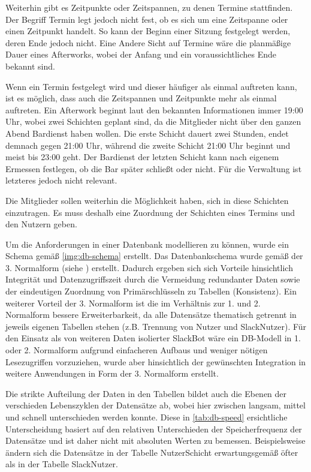 Weiterhin gibt es Zeitpunkte oder Zeitspannen, zu denen Termine stattfinden. Der Begriff Termin legt jedoch nicht fest, ob es sich um eine Zeitspanne oder einen Zeitpunkt handelt. So kann der Beginn einer Sitzung festgelegt werden, deren Ende jedoch nicht. Eine Andere Sicht auf Termine wäre die planmäßige Dauer eines Afterworks, wobei der Anfang und ein voraussichtliches Ende bekannt sind.

Wenn ein Termin festgelegt wird und dieser häufiger als einmal auftreten kann, ist es möglich, dass auch die Zeitspannen und Zeitpunkte mehr als einmal auftreten. Ein Afterwork beginnt laut den bekannten Informationen immer 19:00 Uhr, wobei zwei Schichten geplant sind, da die Mitglieder nicht über den ganzen Abend Bardienst haben wollen. Die erste Schicht dauert zwei Stunden, endet demnach gegen 21:00 Uhr, während die zweite Schicht 21:00 Uhr beginnt und meist bis 23:00 geht. Der Bardienst der letzten Schicht kann nach eigenem Ermessen festlegen, ob die Bar später schließt oder nicht. Für die Verwaltung ist letzteres jedoch nicht relevant.

Die Mitglieder sollen weiterhin die Möglichkeit haben, sich in diese Schichten einzutragen. Es muss deshalb eine Zuordnung der Schichten eines Termins und den Nutzern geben. 


Um die Anforderungen in einer Datenbank modellieren zu können, wurde ein Schema gemäß \autoref{img:db-schema} erstellt. Das Datenbankschema wurde gemäß der 3. Normalform (siehe \cite{CoddRelationalModelData1970}) erstellt. Dadurch ergeben sich sich Vorteile hinsichtlich Integrität und Datenzugriffszeit durch die Vermeidung redundanter Daten sowie der eindeutigen Zuordnung von Primärschlüsseln zu Tabellen (Konsistenz). Ein weiterer Vorteil der 3. Normalform ist die im Verhältnis zur 1. und 2. Normalform bessere Erweiterbarkeit, da alle Datensätze thematisch getrennt in jeweils eigenen Tabellen stehen (z.B. Trennung von Nutzer und SlackNutzer). 
Für den Einsatz als von weiteren Daten isolierter SlackBot wäre ein DB-Modell in 1. oder 2. Normalform aufgrund einfacheren Aufbaus und weniger nötigen Lesezugriffen vorzuziehen, wurde aber hinsichtlich der gewünschten Integration in weitere Anwendungen in Form der 3. Normalform erstellt.

Die strikte Aufteilung der Daten in den Tabellen bildet auch die Ebenen der verschieden Lebenszyklen der Datensätze ab, wobei hier zwischen langsam, mittel und schnell unterschieden werden konnte. Diese in \autoref{tab:db-speed} ersichtliche Unterscheidung basiert auf den relativen Unterschieden der Speicherfrequenz der Datensätze und ist daher nicht mit absoluten Werten zu bemessen. Beispielsweise ändern sich die Datensätze in der Tabelle NutzerSchicht erwartungsgemäß öfter als in der Tabelle SlackNutzer.

